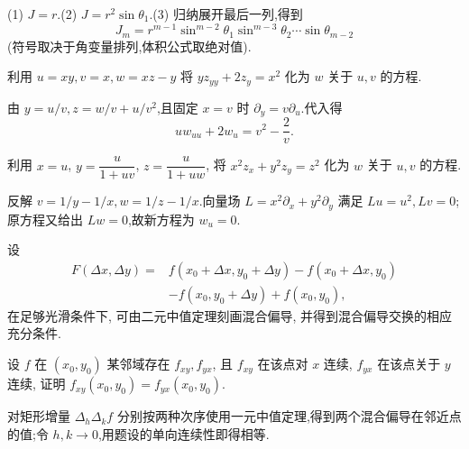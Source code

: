\begin{solution}

    (1) $J=r$.(2) $J=r^2\sin\theta_1$.(3) 归纳展开最后一列,得到
    \[
        J_m=r^{m-1}\sin^{m-2}\theta_1\sin^{m-3}\theta_2\cdots\sin\theta_{m-2}
    \]
    (符号取决于角变量排列,体积公式取绝对值).
\end{solution}

\begin{example}
    利用 $u=xy,v=x,w=xz-y$ 将 $yz_{yy}+2z_y=x^2$ 化为 $w$ 关于 $u,v$ 的方程.
\end{example}
\exampleblank

\begin{solution}
    由 $y=u/v,z=w/v+u/v^2$,且固定 $x=v$ 时 $\partial_y=v\partial_u$.代入得
    \[
        u w_{uu}+2w_u=v^2-\dfrac{2}{v}.
    \]
\end{solution}

\begin{example}
    利用 $x=u$, $\displaystyle y=\dfrac{u}{1+uv}$, $\displaystyle z=\dfrac{u}{1+uw}$, 将 $x^2z_x+y^2z_y=z^2$ 化为 $w$ 关于 $u,v$ 的方程.
\end{example}
\exampleblank

\begin{solution}
    反解 $v=1/y-1/x,w=1/z-1/x$.向量场 $L=x^2\partial_x+y^2\partial_y$ 满足 $Lu=u^2,Lv=0$;原方程又给出 $Lw=0$,故新方程为 $w_u=0$.
\end{solution}

\begin{proposition}[\markstar]
    设
    \[
        \begin{aligned}
            F(\Delta x,\Delta y)={} & f(x_0+\Delta x,y_0+\Delta y)-f(x_0+\Delta x,y_0) \\
                                    & -f(x_0,y_0+\Delta y)+f(x_0,y_0),
        \end{aligned}
    \]
    在足够光滑条件下, 可由二元中值定理刻画混合偏导, 并得到混合偏导交换的相应充分条件.
\end{proposition}

\begin{example}
    设 $f$ 在 $(x_0,y_0)$ 某邻域存在 $f_{xy},f_{yx}$, 且 $f_{xy}$ 在该点对 $x$ 连续, $f_{yx}$ 在该点关于 $y$ 连续, 证明 $f_{xy}(x_0,y_0)=f_{yx}(x_0,y_0)$.
\end{example}
\exampleblank

\begin{solution}
    对矩形增量 $\Delta_h\Delta_kf$ 分别按两种次序使用一元中值定理,得到两个混合偏导在邻近点的值;令 $h,k\to0$,用题设的单向连续性即得相等.
\end{solution}

